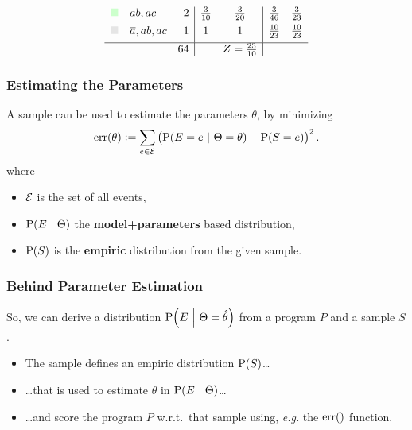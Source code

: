 \documentclass[bigger]{beamer}
\newcommand{\at}[1]{\ensuremath{\!\del{#1}}}
\newcommand{\co}[1]{\ensuremath{\overline{#1}}}
\newcommand{\err}[1]{\ensuremath{\mathrm{err}\at{#1}}}
\newcommand{\fml}[1]{\ensuremath{{\cal #1}}}
\newcommand{\given}{\ensuremath{~\middle|~}}
\newcommand{\pr}[1]{\ensuremath{\mathrm{P}\at{#1}}}
\begin{document}
\begin{frame}
\begin{equation*}
\begin{array}{clr|cc|cc}
            {\color{green!20}\blacksquare }
            & ab, ac
            & 2
            & \frac{3}{10}
            & \frac{3}{20}
            & \frac{3}{46}
            & \frac{3}{23}
            \\[4pt]
            {\color{gray!20}\blacksquare }
            & \co{a}, ab, ac
            & 1
            & 1
            & 1
            & \frac{10}{23}
            & \frac{10}{23}
            \\[4pt]
            \hline
            &
            & 64
            & 
            & Z = \frac{23}{10}
            &
        \end{array}
    \end{equation*}
\end{frame}
%
\begin{frame}
    \frametitle{Estimating the Parameters}
    A \alert{sample} can be used to estimate the parameters $\theta$, by minimizing
    \begin{equation*}
        \err{\theta} := \sum_{e\in\fml{E}} \del{\pr{E = e\given \Theta = \theta} - \pr{S = e}}^2.\label{eq:err.e.s}
    \end{equation*}
    where
    \begin{itemize}
        \item $\fml{E}$ is the set of all events,
        \item $\pr{E\given \Theta}$ the \textbf{model+parameters} based distribution, 
        \item $\pr{S}$ is the \textbf{empiric} distribution from the given sample.
    \end{itemize}  
\end{frame}
%
\begin{frame}
    \frametitle{Behind Parameter Estimation}
    \vfill
    So, we can derive a distribution $\pr{E\given \Theta = \hat{\theta}}$ from a program $P$ and a sample $S$.
    \begin{itemize}
        \item The sample defines an empiric distribution $\pr{S}$\ldots
        \item \ldots that is used to estimate $\theta$ in $\pr{E\given \Theta}$\ldots
        \item \ldots and \alert{score the program} $P$ w.r.t.\ that sample using, \emph{e.g.} the $\err{}$ function.
    \end{itemize}
    \vfill

\end{frame}
\end{document}
